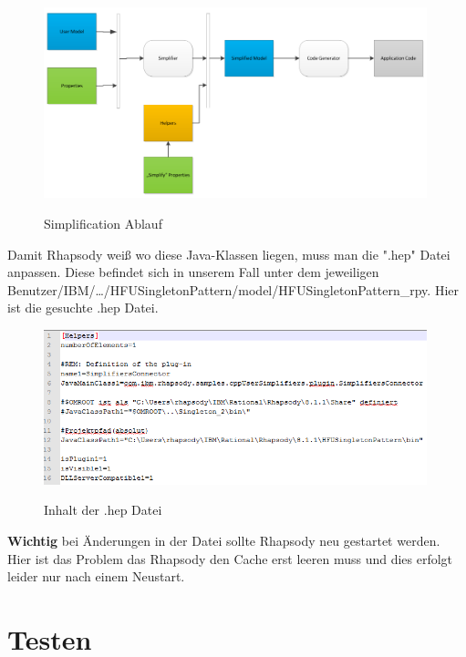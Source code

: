 \begin{figure}[!htbp]
	\centering
	\includegraphics[width=0.99\textwidth]{content/pictures/simplifier.png}
	\label{pic:bild}
	\caption{Simplification Ablauf \cite{oldDoku}}
\end{figure}

Damit Rhapsody weiß wo diese Java-Klassen liegen, muss man die ".hep" Datei
anpassen. Diese befindet sich in unserem Fall unter dem jeweiligen
Benutzer/IBM/\ldots/HFUSingletonPattern/model/HFUSingletonPattern_rpy. Hier ist
die gesuchte .hep Datei.
 
\begin{figure}[!htbp]
	\centering
	\includegraphics[width=0.99\textwidth]{content/pictures/hep.png}
	\label{pic:bild}
	\caption{Inhalt der .hep Datei}
\end{figure} 

\textbf{Wichtig} bei Änderungen in der Datei sollte Rhapsody neu gestartet
werden. Hier ist das Problem das Rhapsody den Cache erst leeren muss und dies
erfolgt leider nur nach einem Neustart. 
\section{Testen}

